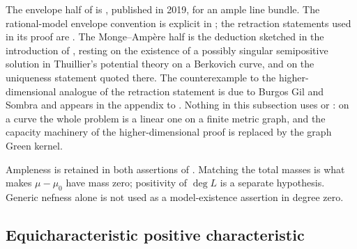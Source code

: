 \begin{remark}
\label{rem:ch29-curve-source}
The envelope half of  is
\cite[Theorem~1.1]{GJKM19}, published in 2019, for an ample line bundle.
The rational-model envelope convention is explicit in
; the retraction statements used in its proof are
\cite[Proposition~1.2 and Propositions~3.5, 3.8]{GJKM19}.  The
Monge--Amp\`ere half is the deduction sketched in the introduction of
\cite{GJKM19}, resting on the existence of a possibly singular semipositive
solution in Thuillier's potential theory on a Berkovich curve, and on the
uniqueness statement quoted there.  The counterexample to the
higher-dimensional analogue of the retraction statement is due to Burgos Gil
and Sombra and appears in the appendix to \cite{GJKM19}.  Nothing in this
subsection uses  or : on a
curve the whole problem is a linear one on a finite metric graph, and the
capacity machinery of the higher-dimensional proof is replaced by the graph
Green kernel.
\end{remark}

\begin{remark}
\label{rem:ch29-curve-nef-ample}
Ampleness is retained in both assertions of
.  Matching the total masses
is what makes \(\mu-\mu_0\) have mass zero; positivity of \(\deg L\)
is a separate hypothesis.  Generic nefness alone is not used as a
model-existence assertion in degree zero.
\end{remark}

\subsection{Equicharacteristic positive characteristic}
\label{sec:ch29-later-positive}

